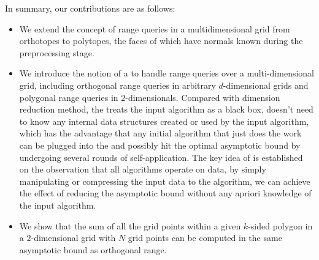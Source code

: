 In summary, our contributions are as follows:
\begin{itemize}

\item We extend the concept of range queries in a multidimensional
  grid from orthotopes to polytopes, the faces of which have normals
  known during the preprocessing stage.

\item We introduce the notion of a  to handle
  range queries over a multi-dimensional grid, including orthogonal
  range queries in arbitrary $d$-dimensional grids and polygonal range
  queries in $2$-dimensionals. Compared with dimension reduction method,
  the  treats the input algorithm as a black box,
  doesn't need to know any internal data structures created or used by
  the input algorithm, which has the advantage that any initial algorithm
  that just does the work can be plugged into the 
  and possibly hit the optimal asymptotic bound by undergoing several
  rounds of self-application. The key idea of  is
  established on the observation that all algorithms operate on data,
  by simply manipulating or compressing the input data to the algorithm,
  we can achieve the effect of reducing the asymptotic bound without
  any apriori knowledge of the input algorithm.

\item We show that the sum of all the grid points within a given
  $k$-sided polygon in a $2$-dimensional 
  grid with $N$ grid points
  can be computed in the same asymptotic bound as 
  orthogonal range. 



\end{itemize}
